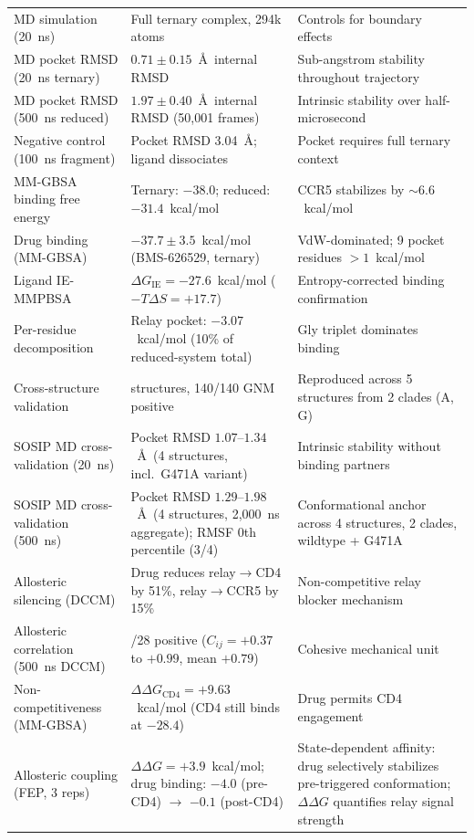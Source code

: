 \documentclass[11pt,a4paper]{article}
\begin{document}
\begin{table}[htbp]
\begin{tabularx}{\textwidth}{@{}p{4.0cm} >{\raggedright\arraybackslash}X >{\raggedright\arraybackslash}X@{}}
MD simulation (20~ns) & Full ternary complex, 294k atoms & Controls for boundary effects \\
MD pocket RMSD (20~ns ternary) & $0.71 \pm 0.15$~\AA\ internal RMSD & Sub-angstrom stability throughout trajectory \\
MD pocket RMSD (500~ns reduced) & $1.97 \pm 0.40$~\AA\ internal RMSD (50,001 frames) & Intrinsic stability over half-microsecond \\
Negative control (100~ns fragment) & Pocket RMSD 3.04~\AA; ligand dissociates & Pocket requires full ternary context \\
MM-GBSA binding free energy & Ternary: $-38.0$; reduced: $-31.4$~kcal/mol & CCR5 stabilizes by ${\sim}6.6$~kcal/mol \\
Drug binding (MM-GBSA) & $-37.7 \pm 3.5$~kcal/mol (BMS-626529, ternary) & VdW-dominated; 9 pocket residues $>1$~kcal/mol \\
Ligand IE-MMPBSA & $\Delta G_\mathrm{IE} = -27.6$~kcal/mol ($-T\Delta S = +17.7$) & Entropy-corrected binding confirmation \\
Per-residue decomposition & Relay pocket: $-3.07$~kcal/mol (10\% of reduced-system total) & Gly triplet dominates binding \\
Cross-structure validation & 5 structures, 140/140 GNM positive & Reproduced across 5 structures from 2 clades (A, G) \\
SOSIP MD cross-validation (20~ns) & Pocket RMSD $1.07$--$1.34$~\AA\ (4 structures, incl.\ G471A variant) & Intrinsic stability without binding partners \\
SOSIP MD cross-validation (500~ns) & Pocket RMSD $1.29$--$1.98$~\AA\ (4 structures, 2{,}000~ns aggregate); RMSF 0th percentile (3/4) & Conformational anchor across 4 structures, 2 clades, wildtype + G471A \\
Allosteric silencing (DCCM) & Drug reduces relay$\to$CD4 by 51\%, relay$\to$CCR5 by 15\% & Non-competitive relay blocker mechanism \\
Allosteric correlation (500~ns DCCM) & 28/28 positive ($C_{ij} = +0.37$ to $+0.99$, mean $+0.79$) & Cohesive mechanical unit \\
Non-competitiveness (MM-GBSA) & $\Delta\Delta G_\mathrm{CD4} = +9.63$~kcal/mol (CD4 still binds at $-28.4$) & Drug permits CD4 engagement \\
Allosteric coupling (FEP, 3 reps) & $\Delta\Delta G = +3.9$~kcal/mol; drug binding: $-4.0$ (pre-CD4) $\to$ $-0.1$ (post-CD4) & State-dependent affinity: drug selectively stabilizes pre-triggered conformation; $\Delta\Delta G$ quantifies relay signal strength \\

\end{tabularx}
\end{table}
\end{document}
